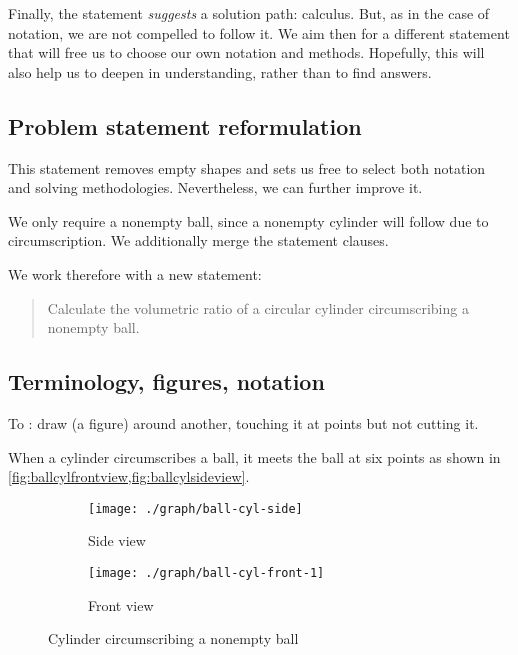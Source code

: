  Finally, the statement \emph{suggests} a solution path: calculus. But, as in the case of notation, we are not compelled to follow it. We aim then for a different statement that will free us to choose our own notation and methods. Hopefully, this will also help us to deepen in understanding, rather than to find  answers.



\subsection{Problem statement reformulation} %
\label{sub:problem_statement_reformulation}
%
  

 This statement removes empty shapes and sets us free to select both notation and solving methodologies. Nevertheless, we can further improve it.

 We only require a nonempty ball, since a nonempty cylinder will follow due to circumscription. We additionally merge the statement clauses.

 We work therefore with a new statement:
%
\begin{quotation}
  Calculate the volumetric ratio of a circular cylinder circumscribing a nonempty ball.
\end{quotation}



\subsection{Terminology, figures, notation} %
\label{sub:terminology_and_notation}

 To : draw (a figure) around another, touching it at points but not cutting it. 

 When a cylinder circumscribes a ball, it meets the ball at six points as shown in \cref{fig:ballcylfrontview,fig:ballcylsideview}.
%
\begin{figure}[b]
  \capstart
  \centering
  \begin{subfigure}[t]{0.3\textwidth}
    \texttt{[image: ./graph/ball-cyl-side]}
    \caption{Side view}
    \label{fig:ballcylfrontview}
  \end{subfigure}
  \qquad\qquad
  \begin{subfigure}[t]{0.3\textwidth}
    \texttt{[image: ./graph/ball-cyl-front-1]}
    \caption{Front view}
    \label{fig:ballcylsideview}
  \end{subfigure}
  \caption{Cylinder circumscribing a nonempty ball}
  \label{fig:ballcylfrontsideview}
\end{figure}

